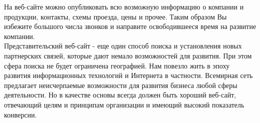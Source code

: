 	\hspace{4ex}На веб-сайте можно опубликовать всю возможную информацию о компании и продукции, контакты, схемы проезда, цены и прочее. Таким образом Вы избежите большого числа звонков и направите освободившееся время на развитие 			компании.\\
	\hspace{4ex}Представительский веб-сайт - еще один способ поиска и установления новых партнерских связей, которые дают немало возможностей для развития. При этом сфера поиска не будет ограничена географией.
	Нам повезло жить в эпоху развития информационных технологий и Интернета в частности. Всемирная сеть предлагает неисчерпаемые возможности для развития бизнеса любой сферы деятельности. Но в качестве основы всегда должен быть хороший 		веб-сайт, отвечающий целям и принципам организации и имеющий высокий показатель конверсии. \\